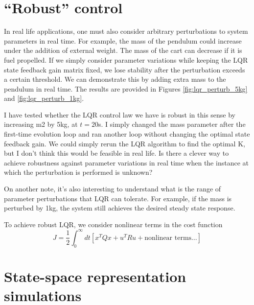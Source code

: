 \documentclass[12pt]{article}
\numberwithin{equation}{section}
\begin{document}
\section{``Robust'' control}
In real life applications, one must also consider arbitrary perturbations to system parameters in real time. For example, the mass of the pendulum could increase under the addition of external weight. The mass of the cart can decrease if it is fuel propelled. If we simply consider parameter variations while keeping the LQR state feedback gain matrix fixed, we lose stability after the perturbation exceeds a certain threshold. We can demonstrate this by adding extra mass to the pendulum in real time. The results are provided in Figures \ref{fig:lqr_perturb_5kg} and \ref{fig:lqr_perturb_1kg}.

I have tested whether the LQR control law we have is robust in this sense by increasing m2 by 5kg, at $t = 20$s. I simply changed the mass parameter after the first-time evolution loop and ran another loop without changing the optimal state feedback gain. We could simply rerun the LQR algorithm to find the optimal K, but I don't think this would be feasible in real life. Is there a clever way to achieve robustness against parameter variations in real time when the instance at which the perturbation is performed is unknown?

On another note, it's also interesting to understand what is the range of parameter perturbations that LQR can tolerate. For example, if the mass is perturbed by 1kg, the system still achieves the desired steady state response.

To achieve robust LQR, we consider nonlinear terms in the cost function
\begin{equation}
    J = \frac{1}{2} \int_{0}^{\infty}dt \left[x^T Q x + u^T R u + \text{nonlinear terms} \dots \right]
\end{equation}
\newpage
\appendix

\section{State-space representation simulations}
\label{app:zero-input-sim}
\end{document}
